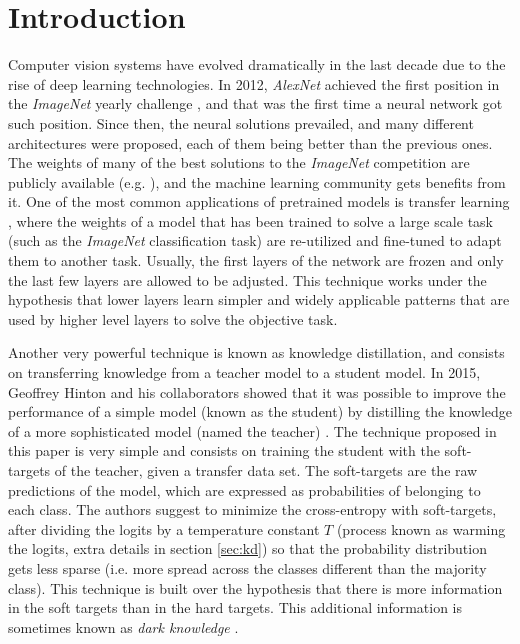 \documentclass{elsarticle}
\begin{document}
	\section{Introduction}
	Computer vision systems have evolved dramatically in the last decade due to the rise of deep learning technologies. In 2012, \textit{AlexNet} \citep{krizhevsky2012} achieved the first position in the \textit{ImageNet} yearly challenge \citep{ILSVRC15}, and that was the first time a neural network got such position. Since then, the neural solutions prevailed, and many different architectures were proposed, each of them being better than the previous ones. The weights of many of the best solutions to the \textit{ImageNet} competition are publicly available (e.g. \cite{he2016, chollet2017, szegedy2016, szegedy2017, howard2017, pham2018, tan2019}), and the machine learning community gets benefits from it. One of the most common applications of pretrained models is transfer learning \citep{zhuang2021}, where the weights of a model that has been trained to solve a large scale task (such as the \textit{ImageNet} classification task) are re-utilized and fine-tuned to adapt them to another task. Usually, the first layers of the network are frozen and only the last few layers are allowed to be adjusted. This technique works under the hypothesis that lower layers learn simpler and widely applicable patterns that are used by higher level layers to solve the objective task.	
	
	Another very powerful technique is known as knowledge distillation, and consists on transferring knowledge from a teacher model to a student model. In 2015, Geoffrey Hinton and his collaborators showed that it was possible to improve the performance of a simple model (known as the student) by distilling the knowledge of a more sophisticated model (named the teacher) \citep{hinton2015}. The technique proposed in this paper is very simple and consists on training the student with the soft-targets of the teacher, given a transfer data set. The soft-targets are the raw predictions of the model, which are expressed as probabilities of belonging to each class. The authors suggest to minimize the cross-entropy with soft-targets, after dividing the logits by a temperature constant $T$ (process known as warming the logits, extra details in section \ref{sec:kd}) so that the probability distribution gets less sparse (i.e. more spread across the classes different than the majority class). This technique is built over the hypothesis that there is more information in the soft targets than in the hard targets. This additional information is sometimes known as \textit{dark knowledge} \citep{gou2020}.
	
\end{document}
